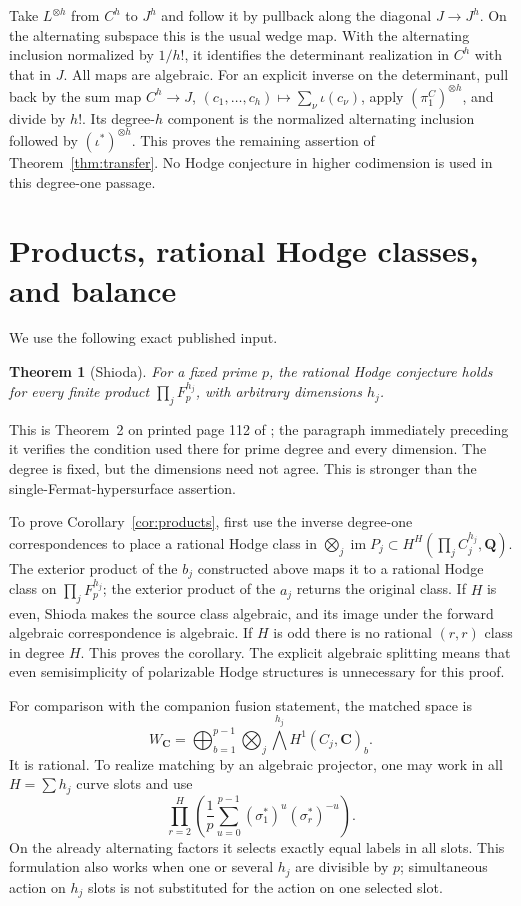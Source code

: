 \documentclass[11pt]{article}
\newtheorem{theorem}{Theorem}[section]
\theoremstyle{remark}\newtheorem{remark}[theorem]{Remark}
\newcommand{\Q}{\mathbf Q}\newcommand{\C}{\mathbf C}
\newcommand{\im}{\operatorname{im}}\newcommand{\id}{\operatorname{id}}
\begin{document}
Take $L^{\otimes h}$ from $C^h$ to $J^h$ and follow it by pullback along
the diagonal $J\to J^h$. On the alternating subspace this is the usual
wedge map. With the alternating inclusion normalized by $1/h!$, it
identifies the determinant realization in $C^h$ with that in $J$.
All maps are algebraic. For an explicit inverse on the determinant,
pull back by the sum map
$C^h\to J$, $(c_1,\ldots,c_h)\mapsto\sum_\nu\iota(c_\nu)$,
apply $(\pi_1^C)^{\otimes h}$, and divide by $h!$.
Its degree-$h$ component is the normalized alternating inclusion followed
by $(\iota^*)^{\otimes h}$. This proves the
remaining assertion of Theorem~\ref{thm:transfer}. No Hodge conjecture in
higher codimension is used in this degree-one passage.

\section{Products, rational Hodge classes, and balance}
We use the following exact published input.

\begin{theorem}[Shioda]\label{thm:shioda}
For a fixed prime $p$, the rational Hodge conjecture holds for every finite
product $\prod_j F_p^{h_j}$, with arbitrary dimensions $h_j$.
\end{theorem}

This is Theorem~2 on printed page 112 of \cite{Shioda79}; the paragraph
immediately preceding it verifies the condition used there for prime
degree and every dimension. The degree is fixed, but the dimensions need
not agree. This is stronger than the single-Fermat-hypersurface assertion.

To prove Corollary~\ref{cor:products}, first use the inverse degree-one
correspondences to place a rational Hodge class in
$\bigotimes_j\im P_j\subset H^H(\prod_j C_j^{h_j},\Q)$.
The exterior product of the $b_j$ constructed above maps it to a rational
Hodge class on $\prod_j F_p^{h_j}$; the exterior product of the $a_j$
returns the original class. If $H$ is even, Shioda makes the source
class algebraic, and its image under the forward algebraic correspondence
is algebraic. If $H$ is odd there is no rational $(r,r)$ class in degree
$H$. This proves the corollary. The explicit algebraic splitting means
that even semisimplicity of polarizable Hodge structures is unnecessary
for this proof.

For comparison with the companion fusion statement, the matched space is
\[
 W_\C=\bigoplus_{b=1}^{p-1}
             \bigotimes_j\bigwedge^{h_j}H^1(C_j,\C)_b.
\]
It is rational. To realize matching by an algebraic projector, one may
work in all $H=\sum h_j$ curve slots and use
\[
 \prod_{r=2}^{H}\left(\frac1p\sum_{u=0}^{p-1}
                  (\sigma_1^*)^u(\sigma_r^*)^{-u}\right).
\]
On the already alternating factors it selects exactly equal labels in
all slots. This formulation also works when one or several $h_j$ are
divisible by $p$; simultaneous action on $h_j$ slots is not substituted
for the action on one selected slot.
\end{document}
